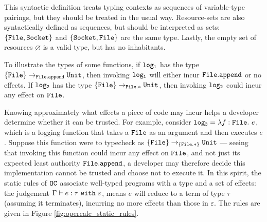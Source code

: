 This syntactic definition treats typing contexts as sequences of variable-type pairings, but they should be treated in the usual way. Resource-sets are also syntactically defined as sequences, but should be interpreted as sets: $\{ \mathtt{File, Socket} \}$ and $\{ \mathtt{Socket, File} \}$ are the same type. Lastly, the empty set of resources $\varnothing$ is a valid type, but has no inhabitants.

To illustrate the types of some functions, if $\mathtt{log_1}$ has the type $\{ \mathtt{File} \} \rightarrow_{\mathtt{File.append}} \mathtt{Unit}$, then invoking $\mathtt{log_1}$ will either incur $\mathtt{File.append}$ or no effects. If $\mathtt{log_2}$ has the type $\{ \mathtt{File} \} \rightarrow_{\mathtt{File.*}} \mathtt{Unit}$, then invoking $\mathtt{log_2}$ could incur any effect on $\mathtt{File}$.

Knowing approximately what effects a piece of code may incur helps a developer determine whether it can be trusted. For example, consider $\mathtt{log_3} = \lambda f: \mathtt{File}.~e$, which is a logging function that takes a $\mathtt{File}$ as an argument and then executes $e$. Suppose this function were to typecheck as $\{ \mathtt{File} \} \rightarrow_{\{ \mathtt{File.*} \}} \mathtt{Unit}$ --- seeing that invoking this function could incur any effect on $\mathtt{File}$, and not just its expected least authority $\mathtt{File.append}$, a developer may therefore decide this implementation cannot be trusted and choose not to execute it. In this spirit, the static rules of $\mathtt{OC}$ associate well-typed programs with a type and a set of effects: the judgement $\Gamma \vdash e: \tau~\mathtt{with}~ \varepsilon$, means $e$ will reduce to a term of type $\tau$ (assuming it terminates), incurring no more effects than those in $\varepsilon$. The rules are given in Figure \ref{fig:opercalc_static_rules}.

